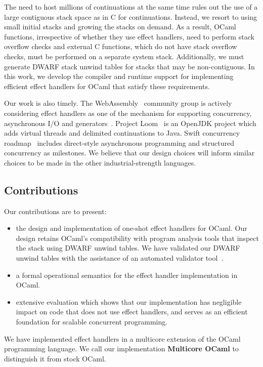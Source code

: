 \documentclass[sigplan,10pt,review,anonymous]{acmart}\settopmatter{printfolios=true,printccs=false,printacmref=false}
\begin{document}
The need to host millions of continuations at the same time rules out the use
of a large contiguous stack space as in C for continuations. Instead, we resort
to using small initial stacks and growing the stacks on demand. As a result,
OCaml functions, irrespective of whether they use effect handlers, need to
perform stack overflow checks and external C functions, which do not have stack
overflow checks, must be performed on a separate system stack. Additionally, we
must generate DWARF stack unwind tables for stacks that may be non-contiguous.
In this work, we develop the compiler and runtime support for implementing
efficient effect handlers for OCaml that satisfy these requirements.

Our work is also timely. The WebAssembly~\cite{Hass17} community group is
actively considering effect handlers as one of the mechanism for supporting
concurrency, asynchronous I/O and generators~\cite{WasmProposal}. Project
Loom~\cite{loom} is an OpenJDK project which adds virtual threads and delimited
continuations to Java. Swift concurrency roadmap~\cite{swift} includes
direct-style asynchronous programming and structured concurrency as milestones.
We believe that our design choices will inform similar choices to be made in the
other industrial-strength languages.

\subsection{Contributions}

Our contributions are to present:

\begin{itemize}
  \item the design and implementation of one-shot effect handlers for OCaml.
    Our design retains OCaml's compatibility with program analysis tools that
    inspect the stack using DWARF unwind tables. We have validated our DWARF
    unwind tables with the assistance of an automated validator
    tool~\cite{Bastian19}.
  \item a formal operational semantics for the effect handler implementation in
    OCaml.
	\item extensive evaluation which shows that our implementation has negligible
		impact on code that does not use effect handlers, and serves as an
		efficient foundation for scalable concurrent programming.
\end{itemize}

We have implemented effect handlers in a multicore extension of the OCaml
programming language. We call our implementation \textbf{Multicore OCaml} to
distinguish it from stock OCaml.
\end{document}
